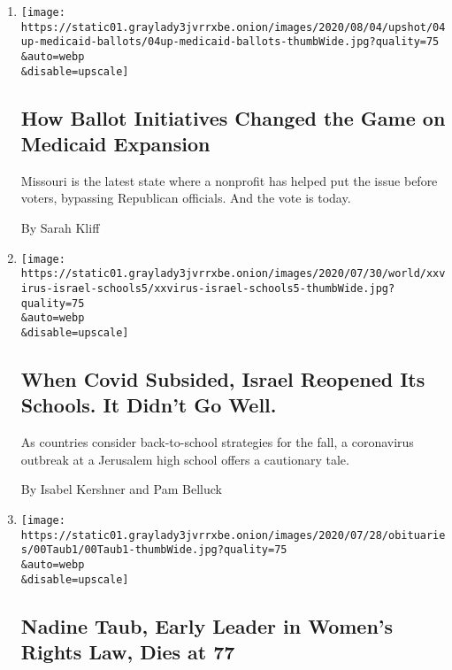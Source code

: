 \begin{enumerate}
\def\labelenumi{\arabic{enumi}.}
\item
  \href{/2020/08/04/upshot/missouri-election-medicaid-expansion.html}{}

  \texttt{[image: https://static01.graylady3jvrrxbe.onion/images/2020/08/04/upshot/04up-medicaid-ballots/04up-medicaid-ballots-thumbWide.jpg?quality=75\\\&auto=webp\\\&disable=upscale]}

  \hypertarget{how-ballot-initiatives-changed-the-game-on-medicaid-expansion}{%
  \subsection{How Ballot Initiatives Changed the Game on Medicaid
  Expansion}\label{how-ballot-initiatives-changed-the-game-on-medicaid-expansion}}

  Missouri is the latest state where a nonprofit has helped put the
  issue before voters, bypassing Republican officials. And the vote is
  today.

  By Sarah Kliff
\item
  \href{/2020/08/04/world/middleeast/coronavirus-israel-schools-reopen.html}{}

  \texttt{[image: https://static01.graylady3jvrrxbe.onion/images/2020/07/30/world/xxvirus-israel-schools5/xxvirus-israel-schools5-thumbWide.jpg?quality=75\\\&auto=webp\\\&disable=upscale]}

  \hypertarget{when-covid-subsided-israel-reopened-its-schools-it-didnt-go-well}{%
  \subsection{When Covid Subsided, Israel Reopened Its Schools. It
  Didn't Go
  Well.}\label{when-covid-subsided-israel-reopened-its-schools-it-didnt-go-well}}

  As countries consider back-to-school strategies for the fall, a
  coronavirus outbreak at a Jerusalem high school offers a cautionary
  tale.

  By Isabel Kershner and Pam Belluck
\item
  \href{/2020/07/24/us/nadine-taub-feminist-lawyer-dead.html}{}

  \texttt{[image: https://static01.graylady3jvrrxbe.onion/images/2020/07/28/obituaries/00Taub1/00Taub1-thumbWide.jpg?quality=75\\\&auto=webp\\\&disable=upscale]}

  \hypertarget{nadine-taub-early-leader-in-womens-rights-law-dies-at-77}{%
  \subsection{Nadine Taub, Early Leader in Women's Rights Law, Dies at
  77}\label{nadine-taub-early-leader-in-womens-rights-law-dies-at-77}}


\end{enumerate}
